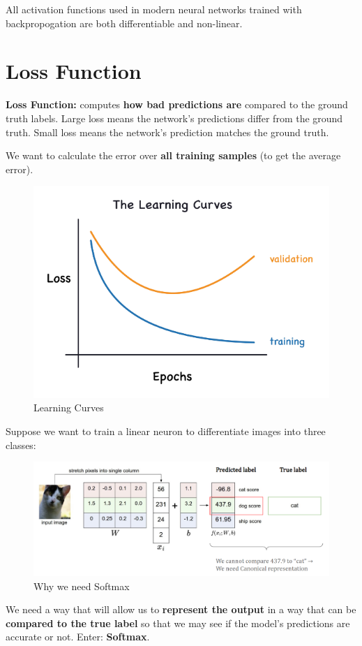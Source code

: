 \begin{idea}
    All activation functions used in modern neural networks trained with backpropogation are both differentiable and non-linear.
\end{idea}

\section{Loss Function}
\begin{definition}
    \textbf{Loss Function:} computes \textbf{how bad predictions are} compared to the ground truth labels. Large loss means the network's predictions differ from the ground truth. Small loss means the network's prediction matches the ground truth.
\end{definition}

We want to calculate the error over \textbf{all training samples} (to get the average error).

\begin{figure}[h!t]
    \centering
    \includegraphics[width=0.25\linewidth]{lossfunction.png}
    \caption{Learning Curves}
    \label{fig:enter-label}
\end{figure}

\newpage

\begin{example}
    Suppose we want to train a linear neuron to differentiate images into three classes:
\end{example}
\begin{figure}[h!t]
    \centering
    \includegraphics[width=0.75\linewidth]{whysoftmax.png}
    \caption{Why we need Softmax}
    \label{fig:enter-label}
\end{figure}
We need a way that will allow us to \textbf{represent the output} in a way that can be \textbf{compared to the true label} so that we may see if the model's predictions are accurate or not. Enter: \textbf{Softmax}.

